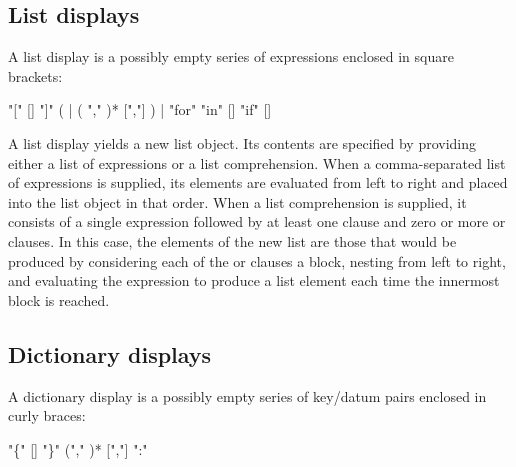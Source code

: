 \subsection{List displays\label{lists}}

A list display is a possibly empty series of expressions enclosed in
square brackets:

\begin{productionlist}
             {"[" [] "]"}
             { ( 
              | ( "," )* [","] )}
             { | }
             {"for"  "in" 
              []}
             {"if"  []}
\end{productionlist}

A list display yields a new list object.  Its contents are specified
by providing either a list of expressions or a list comprehension.
When a comma-separated list of expressions is supplied, its elements are
evaluated from left to right and placed into the list object in that
order.  When a list comprehension is supplied, it consists of a
single expression followed by at least one  clause and zero or
more  or  clauses.  In this
case, the elements of the new list are those that would be produced
by considering each of the  or  clauses a block,
nesting from
left to right, and evaluating the expression to produce a list element
each time the innermost block is reached.


\subsection{Dictionary displays\label{dict}}

A dictionary display is a possibly empty series of key/datum pairs
enclosed in curly braces:

\begin{productionlist}
             {"\{" [] "\}"}
             { ("," )* [","]}
             { ":" }
\end{productionlist}

